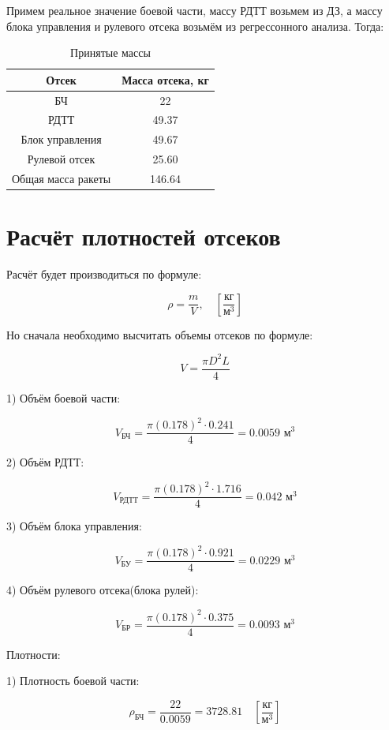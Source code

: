 \documentclass[a4paper,12pt]{report}
\begin{document}
Примем реальное значение боевой части, массу РДТТ  возьмем из ДЗ, а массу блока управления и рулевого отсека возьмём из регрессонного анализа. Тогда:

\captionsetup[table]{position=top, singlelinecheck=false, justification=raggedleft}

\begin{table}[H]
\caption{Принятые массы}
\centering
\begin{tabular}{|c|c|}
\hline
\textbf{Отсек} & \textbf{Масса отсека, кг} \\
\hline
БЧ & 22 \\
\hline
РДТТ & 49.37\\
\hline
Блок управления & 49.67\\
\hline
Рулевой отсек & 25.60 \\
\hline
Общая масса ракеты & 146.64 \\
\hline
\end{tabular}
\label{tab:three_columns}
\end{table}

\section{Расчёт плотностей отсеков}

Расчёт будет производиться по формуле:

\[ \rho = \frac{m}{V}, \quad \left[\frac{\text{кг}}{\text{м}^3}\right] \]

Но сначала необходимо высчитать объемы отсеков по формуле: 

\[V = \frac{\pi D^2 L}{4} \]

1) Объём боевой части:

\[V_{\text{БЧ}} = \frac{\pi (0.178)^2 \cdot 0.241}{4} = 0.0059{\text{ м}^3} \]

2) Объём РДТТ:

\[V_{\text{РДТТ}} = \frac{\pi (0.178)^2 \cdot 1.716}{4} = 0.042{\text{ м}^3} \]

3) Объём блока управления:

\[V_{\text{БУ}} = \frac{\pi (0.178)^2 \cdot 0.921}{4} = 0.0229{\text{ м}^3} \]

4) Объём рулевого отсека(блока рулей):

\[V_{\text{БР}} = \frac{\pi (0.178)^2 \cdot 0.375}{4} = 0.0093{\text{ м}^3} \]

Плотности:

1) Плотность боевой части:

\[ \rho_{\text{БЧ}} = \frac{22}{0.0059} = 3728.81 \quad \left[\frac{\text{кг}}{\text{м}^3}\right]\]
\end{document}
